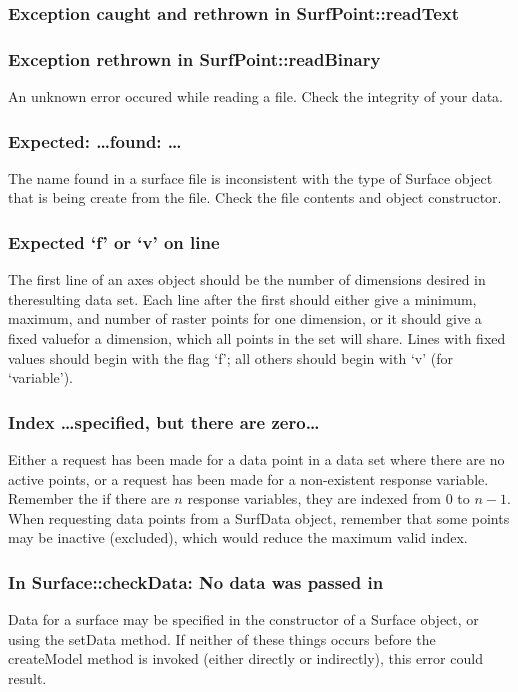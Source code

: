 \documentclass{article}
\begin{document}
\subsubsection{Exception caught and rethrown in SurfPoint::readText}
\subsubsection{Exception rethrown in SurfPoint::readBinary}
An unknown error occured while reading a file.  Check the integrity of your
data.

\subsubsection{Expected: \ldots found: \ldots} 
The name found in a surface file is inconsistent with the type of Surface object
that is being create from the file.  Check the file contents and object
constructor.

\subsubsection{Expected `f' or `v' on line}
The first line of an axes object should be the number of dimensions desired in
theresulting data set.  Each line after the first should either give a minimum,
maximum, and number of raster points for one dimension, or it should give a
fixed valuefor a dimension, which all points in the set will share.  Lines with
fixed values should begin with the flag `f'; all others should begin with `v'
(for `variable').
\subsubsection{Index \ldots specified, but there are zero\ldots}
Either a request has been made for a data point in a data set where there are no
active points, or a request has been made for a non-existent response variable.
Remember the if there are $n$ response variables, they are indexed from $0$ to
$n-1$.  When requesting data points from a SurfData object, remember that some
points may be inactive (excluded), which would reduce the maximum valid index.

\subsubsection{In Surface::checkData: No data was passed in}
Data for a surface may be specified in the constructor of a Surface object, or
using the setData method.  If neither of these things occurs before the
createModel method is invoked (either directly or indirectly), this error could
result.
\end{document}
